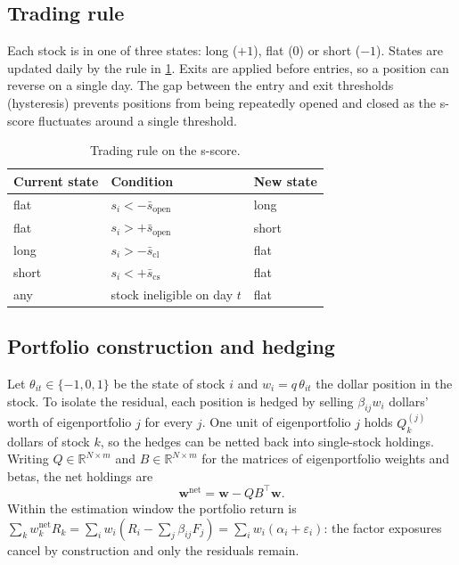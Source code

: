 \subsection{Trading rule}
\label{sec:method:rule}

Each stock is in one of three states: long ($+1$), flat ($0$) or short ($-1$). States are
updated daily by the rule in \cref{tab:rule}. Exits are applied before entries, so a position can
reverse on a single day. The gap between the entry and exit thresholds (hysteresis) prevents
positions from being repeatedly opened and closed as the s-score fluctuates around a single
threshold.

\begin{table}[ht]
\centering
\caption{Trading rule on the s-score.}
\label{tab:rule}
\begin{tabular}{lll}
\toprule
Current state & Condition & New state \\
\midrule
flat & $s_i < -\bar s_{\text{open}}$ & long \\
flat & $s_i > +\bar s_{\text{open}}$ & short \\
long & $s_i > -\bar s_{\text{cl}}$ & flat \\
short & $s_i < +\bar s_{\text{cs}}$ & flat \\
any & stock ineligible on day $t$ & flat \\
\bottomrule
\end{tabular}
\end{table}

\subsection{Portfolio construction and hedging}
\label{sec:method:portfolio}

Let $\theta_{it} \in \{-1,0,1\}$ be the state of stock $i$ and $w_i = q\,\theta_{it}$ the
dollar position in the stock. To isolate the residual, each position is hedged by selling
$\beta_{ij} w_i$ dollars' worth of eigenportfolio $j$ for every $j$. One unit of eigenportfolio
$j$ holds $Q_k^{(j)}$ dollars of stock $k$, so the hedges can be netted back into single-stock
holdings. Writing $Q \in \mathbb R^{N\times m}$ and $B \in \mathbb R^{N\times m}$ for the
matrices of eigenportfolio weights and betas, the net holdings are
\begin{equation}
  \bm w^{\text{net}} = \bm w - Q B^\top \bm w .
  \label{eq:netting}
\end{equation}
Within the estimation window the portfolio return is
$\sum_k w^{\text{net}}_k R_k = \sum_i w_i (R_i - \sum_j \beta_{ij} F_j) = \sum_i w_i(\alpha_i + \varepsilon_i)$:
the factor exposures cancel by construction and only the residuals remain.

